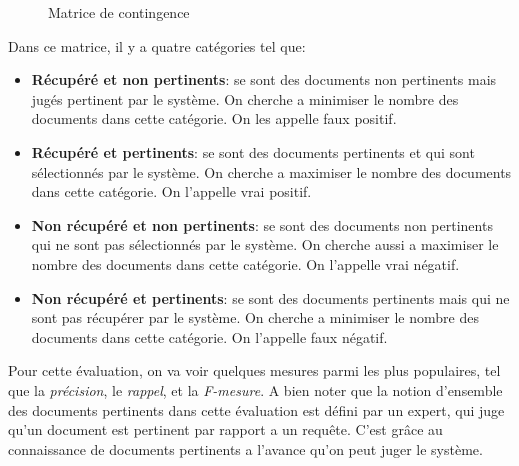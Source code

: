 \begin{figure}[htbp]
	\begin{center}
	\end{center}
	\caption{Matrice de contingence \citep{vsm-for-arabic-language}}
	\label{fig:matrice-contingence}
\end{figure}

Dans ce matrice, il y a quatre catégories tel que:
\begin{itemize}
	\item \textbf{Récupéré et non pertinents}: se sont des documents non pertinents mais jugés pertinent par le système. On cherche a minimiser le nombre des documents dans cette catégorie. On les appelle faux positif.
	\item \textbf{Récupéré et pertinents}: se sont des documents pertinents et qui sont sélectionnés par le système. On cherche a maximiser le nombre des documents dans cette catégorie. On l'appelle vrai positif.
	\item \textbf{Non récupéré et non pertinents}: se sont des documents non pertinents qui ne sont pas sélectionnés par le système. On cherche aussi a maximiser le nombre des documents dans cette catégorie. On l'appelle vrai négatif.
	\item \textbf{Non récupéré et pertinents}: se sont des documents pertinents mais qui ne sont pas récupérer par le système. On cherche a minimiser le nombre des documents dans cette catégorie. On l'appelle faux négatif.
\end{itemize}

Pour cette évaluation, on va voir quelques mesures parmi les plus populaires, tel que la \textit{précision}, le \textit{rappel}, et la \textit{F-mesure}. A bien noter que la notion d'ensemble des documents pertinents dans cette évaluation est défini par un expert, qui juge qu'un document est pertinent par rapport a un requête. C'est grâce au connaissance de documents pertinents a l'avance qu'on peut juger le système.

